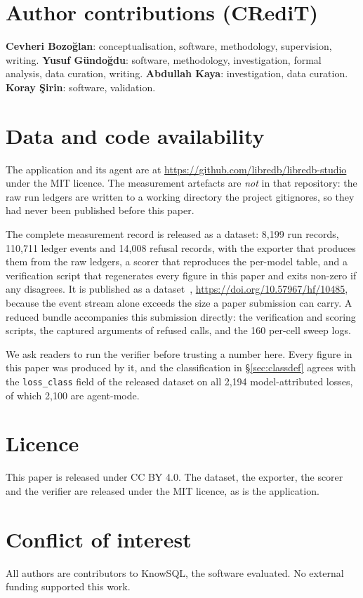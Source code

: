 \documentclass[11pt]{article}
\newcommand{\code}[1]{\texttt{\small #1}}
\begin{document}
\section*{Author contributions (CRediT)}
\noindent
\textbf{Cevheri Bozo\u{g}lan}: conceptualisation, software, methodology, supervision, writing.
\textbf{Yusuf G\"{u}ndo\u{g}du}: software, methodology, investigation, formal analysis, data curation, writing.
\textbf{Abdullah Kaya}: investigation, data curation.
\textbf{Koray \c{S}irin}: software, validation.

\section*{Data and code availability}
The application and its agent are at \url{https://github.com/libredb/libredb-studio} under the MIT licence.
The measurement artefacts are \emph{not} in that repository: the raw run ledgers are written to a working
directory the project gitignores, so they had never been published before this paper.

The complete measurement record is released as a dataset: 8{,}199 run records, 110{,}711 ledger events and
14{,}008 refusal records, with the exporter that produces them from the raw ledgers, a scorer that reproduces the
per-model table, and a verification script that regenerates every figure in this paper and exits non-zero if any
disagrees. It is published as a dataset~\cite{libredb2026dataset},
\url{https://doi.org/10.57967/hf/10485}, because the event stream alone exceeds the size a paper submission
can carry. A reduced bundle accompanies this submission directly: the verification and scoring
scripts, the captured arguments of refused calls, and the 160 per-cell sweep logs.

We ask readers to run the verifier before trusting a number here. Every figure in this paper was produced by it,
and the classification in \S\ref{sec:classdef} agrees with the \code{loss\_class} field of the released dataset
on all 2{,}194 model-attributed losses, of which 2{,}100 are agent-mode.

\section*{Licence}
This paper is released under CC BY 4.0. The dataset, the exporter, the scorer and the verifier are released under
the MIT licence, as is the application.

\section*{Conflict of interest}
All authors are contributors to KnowSQL, the software evaluated. No external funding supported this work.
\end{document}
